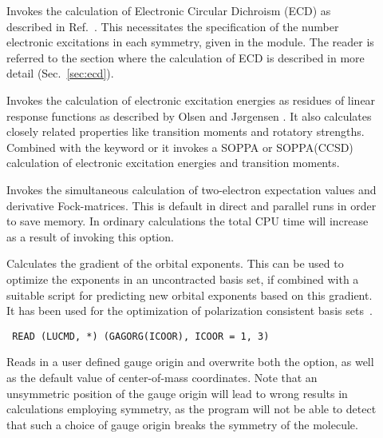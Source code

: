 \begin{description}
\item[] Invokes the calculation of Electronic Circular
Dichroism (ECD) as
described in Ref.~\cite{klbaehkrthjopjtca90,mpkrthcpl388}. This
necessitates the specification of the number electronic
excitations in
each symmetry, given in the  module. The reader is
referred to the section where the calculation of ECD is described in
more detail (Sec.~\ref{sec:ecd}).

\item[] Invokes the calculation of electronic
excitation
energies as residues of linear response functions
as described by Olsen and J\o rgensen \cite{jopjjcp82}. It also
calculates closely related properties like transition
moments and
rotatory strengths. Combined with the
keyword  or  it invokes a SOPPA
or SOPPA(CCSD) calculation of electronic
excitation energies and transition moments.


\item[] Invokes the simultaneous calculation of
two-electron expectation values and derivative Fock-matrices. This is
default in direct and parallel runs in order to save memory. In
ordinary calculations the total CPU time will increase as a result of
invoking this option.

\item[] Calculates the gradient of the orbital
  exponents. This can be used to optimize the exponents in an
  uncontracted basis set, if combined with a suitable script for
  predicting new orbital exponents based on this gradient.
  It has been used for the optimization of polarization consistent basis
  sets~\cite{fjjcp115}.

\item[]\verb| |\newline
\verb|READ (LUCMD, *) (GAGORG(ICOOR), ICOOR = 1, 3)|

Reads in a user defined gauge origin and overwrite
both the  option, as well as the default value of
center-of-mass coordinates. Note that an unsymmetric position of the
gauge origin will lead to wrong results in calculations employing
symmetry, as the program will not be able to detect that such a choice
of gauge origin breaks the symmetry of the molecule.


\end{description}
